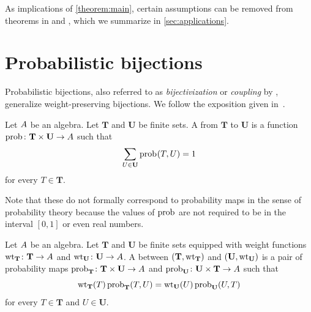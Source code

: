As implications of \cref{theorem:main},
certain assumptions can be removed from
theorems in \cite{Ale19} and \cite{CMW22},
which we summarize in \cref{sec:applications}.

\section{Probabilistic bijections}

Probabilistic bijections,
also referred to as \emph{bijectivization} or \emph{coupling} by \cite{BP19},
generalize weight-preserving bijections.
We follow the exposition given in~\cite{AF22}.

\begin{definition}
	Let \(A\) be an algebra.
	Let \(\mathbf{T}\) and \(\mathbf{U}\) be finite sets.
	A  from \(\mathbf{T}\) to \(\mathbf{U}\) is
	a function \(\operatorname{prob}_{} \colon \mathbf{T} \times \mathbf{U} \to A\) such that
	\begin{equation*}
		\sum_{U \in\mathbf{U}} \operatorname{prob}_{}(T, U) = 1
	\end{equation*}
	for every \(T \in \mathbf{T}\).
\end{definition}

Note that these do not formally correspond to probability maps
in the sense of probability theory
because the values of \(\operatorname{prob}_{}\)
are not required to be in the interval \([0, 1]\) or even real numbers.

\begin{definition}\label{def:prob}
	Let \(A\) be an algebra.
	Let \(\mathbf{T}\) and \(\mathbf{U}\) be finite sets
	equipped with weight functions
	\(\wt_{\mathbf{T}} \colon \mathbf{T} \to \algebra\) and
	\(\wt_{\mathbf{U}} \colon \mathbf{U} \to \algebra\).
	A  between
	\( (\mathbf{T}, \wt_{\mathbf{T}}) \) and
	\( (\mathbf{U}, \wt_{\mathbf{U}}) \) is
	a pair of probability maps
	\(\operatorname{prob}_{\mathbf{T}} \colon \mathbf{T} \times \mathbf{U} \to A\) and
	\(\operatorname{prob}_{\mathbf{U}} \colon \mathbf{U} \times \mathbf{T} \to A\)
	such that
	\begin{equation*}
		\wt_{\mathbf{T}}(T) \prob{\mathbf{T}}(T, U)
		= \wt_{\mathbf{U}}(U) \prob{\mathbf{U}}(U, T)
	\end{equation*}
	for every \(T \in \mathbf{T}\) and \(U \in \mathbf{U}\).
\end{definition}

